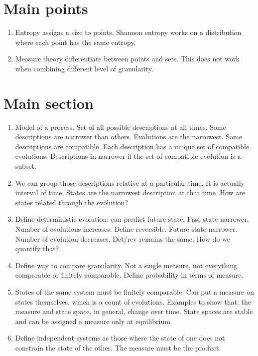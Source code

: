 \documentclass[letterpaper]{article}
\begin{document}
\section{Main points}
\begin{enumerate}
	\item Entropy assigns a size to points. Shannon entropy works on a distribution where each point has the same entropy.
	\item Measure theory differentiate between points and sets. This does not work when combining different level of granularity.
\end{enumerate}

\section{Main section}
\begin{enumerate}
	\item Model of a process. Set of all possible descriptions at all times. Some descriptions are narrower than others. Evolutions are the narrowest. Some descriptions are compatible. Each description has a unique set of compatible evolutions. Descriptions in narrower if the set of compatible evolution is a subset.
	\item We can group those descriptions relative at a particular time. It is actually interval of time. States are the narrowest description at that time. How are states related through the evolution?
	\item Define deterministic evolution: can predict future state. Past state narrower. Number of evolutions increases. Define reversible. Future state narrower. Number of evolution decreases. Det/rev remains the same. How do we quantify that?
	\item Define way to compare granularity. Not a single measure, not everything comparable or finitely comparable. Define probability in terms of measure.
	\item States of the same system must be finitely comparable. Can put a measure on states themselves, which is a count of evolutions. Examples to show that: the measure and state space, in general, change over time. State spaces are stable and can be assigned a measure only at equilibrium.
	\item Define independent systems as those where the state of one does not constrain the state of the other. The measure must be the product.
	
\end{enumerate}
\end{document}
